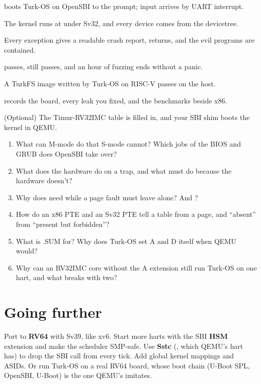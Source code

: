 \documentclass[11pt,a4paper]{article}
\begin{document}
\begin{milestonebox}
\begin{checklist}
  \item {} boots Turk-OS on OpenSBI to the  prompt; input arrives by
    UART interrupt.
  \item The kernel runs at  under Sv32, and every device comes from the devicetree.
  \item Every exception gives a readable crash report,  returns, and the evil programs are contained.
  \item {} passes,  still passes, and an hour of fuzzing ends
    without a panic.
  \item A TurkFS image written by Turk-OS on RISC-V passes  on the host.
  \item {} records the board, every leak you fixed, and the benchmarks beside x86.
  \item (Optional) The Timur-RV32IMC table is filled in, and your SBI shim boots the kernel in QEMU.
\end{checklist}
\end{milestonebox}

\begin{questionbox}
\begin{enumerate}
  \item What can M-mode do that S-mode cannot? Which jobs of the BIOS and GRUB does OpenSBI take over?
  \item What does the hardware do on a trap, and what must  do because the hardware doesn't?
  \item Why does  need  while a page fault must leave  alone? And ?
  \item How do an x86 PTE and an Sv32 PTE tell a table from a page, and ``absent'' from ``present but forbidden''?
  \item What is .SUM for? Why does Turk-OS set A and D itself when QEMU would?
  \item Why can an RV32IMC core without the A extension still run Turk-OS on one hart, and what breaks with two?
\end{enumerate}
\end{questionbox}

\section{Going further}

Port to \textbf{RV64} with Sv39, like xv6. Start more harts with the SBI \textbf{HSM} extension and make the scheduler
SMP-safe. Use \textbf{Sstc} (, which QEMU's hart has) to drop the SBI call from every tick. Add global
kernel mappings and ASIDs. Or run Turk-OS on a real RV64 board, whose boot chain (U-Boot SPL, OpenSBI, U-Boot) is the
one QEMU's  imitates.

\booklegend
\portlegend
\end{document}
